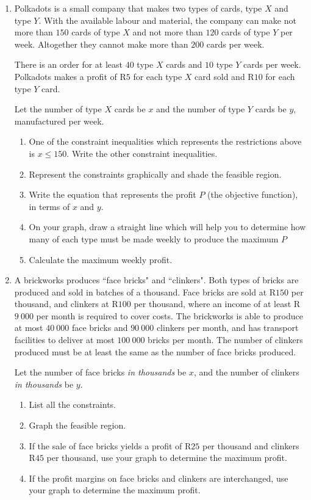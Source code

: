 \begin{eocexercises}{}
\begin{enumerate}

\item{Polkadots is a small company that makes two types of cards, type $X$ and type $Y$. With the available labour and material, the company can make not more than $150$ cards of type $X$ and not more than $120$ cards of type $Y$ per week. Altogether they cannot make more than $200$ cards per week.

There is an order for at least $40$ type $X$ cards and $10$ type $Y$ cards per week.
Polkadots makes a profit of R$5$ for each type $X$ card sold and R$10$ for each type $Y$ card.

Let the number of type $X$ cards be $x$ and the number of type $Y$ cards be $y$, manufactured per week.

\begin{enumerate}
\item{One of the constraint inequalities which represents the restrictions above is $x\leq 150$. Write the other constraint inequalities.}
\item{Represent the constraints graphically and shade the feasible region.}
\item{Write the equation that represents the profit $P$ (the objective function), in terms of $x$ and $y$.}
\item{On your graph, draw a straight line which will help you to determine how many of each type must be made weekly to produce the maximum $P$}
\item{Calculate the maximum weekly profit.}
\end{enumerate}}

\item{A brickworks produces ``face bricks" and ``clinkers". Both types of bricks are produced and sold in batches of a thousand. Face bricks are sold at R$150$ per thousand, and clinkers at R$100$ per thousand, where an income of at least R$9~000$ per month is required to cover costs. The brickworks is able to produce at most $40~000$ face bricks and $90~000$ clinkers per month, and has transport facilities to deliver at most $100~000$ bricks per month. The number of clinkers produced must be at least the same as the number of face bricks produced.

Let the number of face bricks \textit{in thousands} be $x$, and the number of clinkers \textit{in thousands} be $y$.
\begin{enumerate}
\item{List all the constraints.}
\item{Graph the feasible region.}
\item{If the sale of face bricks yields a profit of R$25$ per thousand and clinkers R$45$ per thousand, use your graph to determine the maximum profit.}
\item{If the profit margins on face bricks and clinkers are interchanged, use your graph to determine the maximum profit.}
\end{enumerate}}


\end{enumerate}
\end{eocexercises}
